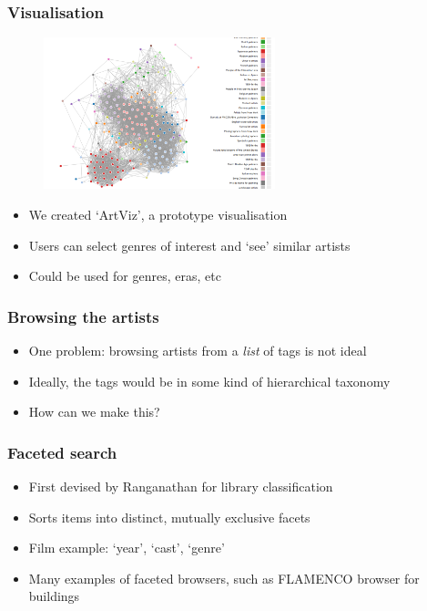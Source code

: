 \documentclass{beamer}
\begin{document}
\begin{frame}
    \frametitle{Visualisation}
    \begin{figure}
        \centering
        \includegraphics[width=0.6\textwidth]{artvis1.png}
    \end{figure}
        \begin{itemize}
            \item We created `ArtViz', a prototype visualisation
            \item Users can select genres of interest and `see' similar artists
            \item Could be used for genres, eras, etc
        \end{itemize}
\end{frame}

\begin{frame}
    \frametitle{Browsing the artists}
        \begin{itemize}
          \item One problem: browsing artists from a \emph{list} of tags is not ideal
            \item Ideally, the tags would be in some kind of hierarchical taxonomy
            \item How can we make this?
        \end{itemize}
\end{frame}

\begin{frame}
    \frametitle{Faceted search}
        \begin{itemize}
            \item First devised by Ranganathan \cite{ranganathan} for library classification
            \item Sorts items into distinct, mutually exclusive facets
            \item Film example: `year', `cast', `genre'
            \item Many examples of faceted browsers, such as FLAMENCO browser for buildings \cite{hearst}
        \end{itemize}
\end{frame}
\end{document}
